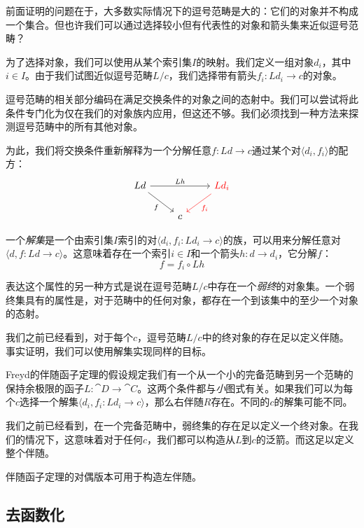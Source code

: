 \documentclass[DaoFP]{subfiles}
\begin{document}
    前面证明的问题在于，大多数实际情况下的逗号范畴是大的：它们的对象并不构成一个集合。但也许我们可以通过选择较小但有代表性的对象和箭头集来近似逗号范畴？

    为了选择对象，我们可以使用从某个索引集$I$的映射。我们定义一组对象$d_i$，其中$i \in I$。由于我们试图近似逗号范畴$L/c$，我们选择带有箭头$f_i \colon L d_i \to c$的对象。

    逗号范畴的相关部分编码在满足交换条件的对象之间的态射中。我们可以尝试将此条件专门化为仅在我们的对象族内应用，但这还不够。我们必须找到一种方法来探测逗号范畴中的所有其他对象。

    为此，我们将交换条件重新解释为一个分解任意$f \colon L d \to c$通过某个对$\langle d_i, f_i \rangle$的配方：
    \[
        \begin{tikzcd}
            L d
            \arrow[rd, "f"']
            \arrow[rr, "L h"]
            && \textcolor{red}{L d_i}
            \arrow[ld, red, "f_i"]
            \\
            &c
        \end{tikzcd}
    \]

    一个\emph{解集}是一个由索引集$I$索引的对$\langle d_i, f_i \colon L d_i \to c \rangle $的族，可以用来分解任意对$\langle d, f \colon L d \to c \rangle $。这意味着存在一个索引$i \in I$和一个箭头$h \colon d \to d_i$，它分解$f$：
    \[ f = f_i \circ L h \]

    表达这个属性的另一种方式是说在逗号范畴$L/c$中存在一个\emph{弱终}的对象集。一个弱终集具有的属性是，对于范畴中的任何对象，都存在一个到该集中的至少一个对象的态射。

    我们之前已经看到，对于每个$c$，逗号范畴$L/c$中的终对象的存在足以定义伴随。事实证明，我们可以使用解集实现同样的目标。

    Freyd的伴随函子定理的假设规定我们有一个从一个小的完备范畴到另一个范畴的保持余极限的函子$L \colon \cat D \to \cat C$。这两个条件都与\emph{小}图式有关。如果我们可以为每个$c$选择一个解集$\langle d_i, f_i \colon L d_i \to c \rangle $，那么右伴随$R$存在。不同的$c$的解集可能不同。

    我们之前已经看到，在一个完备范畴中，弱终集的存在足以定义一个终对象。在我们的情况下，这意味着对于任何$c$，我们都可以构造从$L$到$c$的泛箭。而这足以定义整个伴随。

    伴随函子定理的对偶版本可用于构造左伴随。

    \subsection{去函数化}
\end{document}
